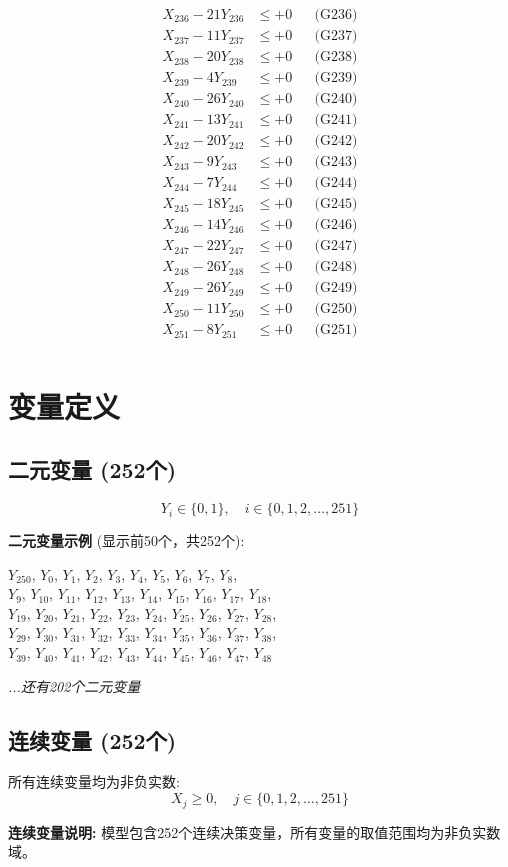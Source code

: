 \documentclass[a4paper,10pt]{article}
\begin{document}
{\begin{align}
X_{236} - 21Y_{236} &\leq +0 && \text{(G236)} \\
X_{237} - 11Y_{237} &\leq +0 && \text{(G237)} \\
\allowbreak
X_{238} - 20Y_{238} &\leq +0 && \text{(G238)} \\
X_{239} - 4Y_{239} &\leq +0 && \text{(G239)} \\
X_{240} - 26Y_{240} &\leq +0 && \text{(G240)} \\
X_{241} - 13Y_{241} &\leq +0 && \text{(G241)} \\
X_{242} - 20Y_{242} &\leq +0 && \text{(G242)} \\
X_{243} - 9Y_{243} &\leq +0 && \text{(G243)} \\
X_{244} - 7Y_{244} &\leq +0 && \text{(G244)} \\
X_{245} - 18Y_{245} &\leq +0 && \text{(G245)} \\
X_{246} - 14Y_{246} &\leq +0 && \text{(G246)} \\
X_{247} - 22Y_{247} &\leq +0 && \text{(G247)} \\
\allowbreak
X_{248} - 26Y_{248} &\leq +0 && \text{(G248)} \\
X_{249} - 26Y_{249} &\leq +0 && \text{(G249)} \\
X_{250} - 11Y_{250} &\leq +0 && \text{(G250)} \\
X_{251} - 8Y_{251} &\leq +0 && \text{(G251)} \\
\end{align}
}

\section{变量定义}

\subsection{二元变量 (252个)}

\begin{equation}
Y_i \in \{0,1\}, \quad i \in \{0, 1, 2, \ldots, 251\}
\end{equation}

\textbf{二元变量示例} (显示前50个，共252个):

{\small
$Y_{250}$, $Y_{0}$, $Y_{1}$, $Y_{2}$, $Y_{3}$, $Y_{4}$, $Y_{5}$, $Y_{6}$, $Y_{7}$, $Y_{8}$, \\
$Y_{9}$, $Y_{10}$, $Y_{11}$, $Y_{12}$, $Y_{13}$, $Y_{14}$, $Y_{15}$, $Y_{16}$, $Y_{17}$, $Y_{18}$, \\
$Y_{19}$, $Y_{20}$, $Y_{21}$, $Y_{22}$, $Y_{23}$, $Y_{24}$, $Y_{25}$, $Y_{26}$, $Y_{27}$, $Y_{28}$, \\
$Y_{29}$, $Y_{30}$, $Y_{31}$, $Y_{32}$, $Y_{33}$, $Y_{34}$, $Y_{35}$, $Y_{36}$, $Y_{37}$, $Y_{38}$, \\
$Y_{39}$, $Y_{40}$, $Y_{41}$, $Y_{42}$, $Y_{43}$, $Y_{44}$, $Y_{45}$, $Y_{46}$, $Y_{47}$, $Y_{48}$

\textit{...还有202个二元变量}
}

\subsection{连续变量 (252个)}

所有连续变量均为非负实数:
\begin{equation}
X_j \geq 0, \quad j \in \{0, 1, 2, \ldots, 251\}
\end{equation}

\textbf{连续变量说明:} 模型包含252个连续决策变量，所有变量的取值范围均为非负实数域。
\end{document}
